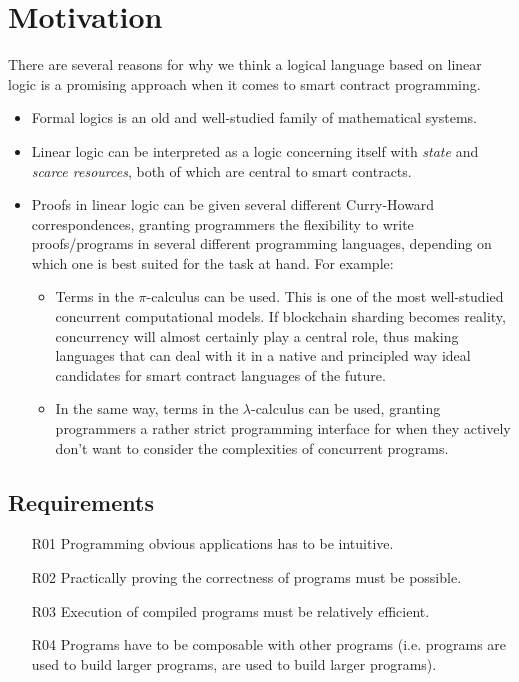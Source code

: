 \documentclass[sigconf]{acmart}
\begin{document}
\section{Motivation}
There are several reasons for why we think a logical language based on linear logic is a promising approach when it comes to smart contract programming.

\begin{itemize}
  \item Formal logics is an old and well-studied family of mathematical systems.
  \item Linear logic can be interpreted as a logic concerning itself with \emph{state} and \emph{scarce resources}, both of which are central to smart contracts.
  \item Proofs in linear logic can be given several different Curry-Howard correspondences, granting programmers the flexibility to write proofs/programs in several different programming languages, depending on which one is best suited for the task at hand. For example:
  \begin{itemize}
  		\item Terms in the $\pi$-calculus can be used. This is one of the most well-studied concurrent computational models. If blockchain sharding becomes reality, concurrency will almost certainly play a central role, thus making languages that can deal with it in a native and principled way ideal candidates for smart contract languages of the future.
  		\item In the same way, terms in the $\lambda$-calculus can be used, granting programmers a rather strict programming interface for when they actively don't want to consider the complexities of concurrent programs.
  \end{itemize}
\end{itemize}

\subsection{Requirements}

\begin{enumerate}
  \item[R01] Programming obvious applications has to be intuitive.
  \item[R02] Practically proving the correctness of programs must be possible.
  \item[R03] Execution of compiled programs must be relatively efficient.
  \item[R04] Programs have to be composable with other programs (i.e. programs are used to build larger programs, are used to build larger programs).
\end{enumerate}
\end{document}
